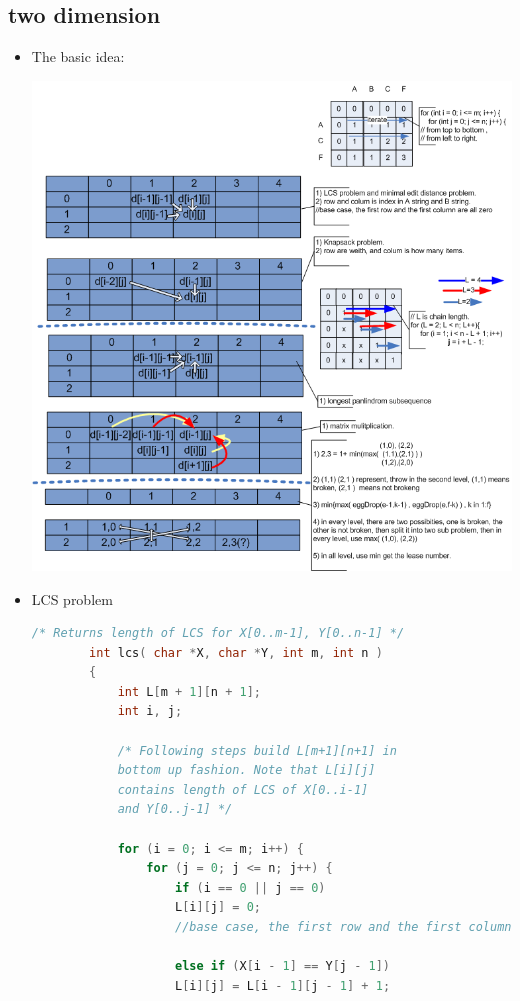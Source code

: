 \documentclass[a4paper,11pt,twoside]{book}
\begin{document}
\subsection{two dimension}

\begin{itemize}
	\item The basic idea: \newline
	
	\includegraphics[scale=0.65]{pics/two_dimension.png} \newline
	
	\item LCS problem 
	\begin{lstlisting}[frame=single, language=c++]
		/* Returns length of LCS for X[0..m-1], Y[0..n-1] */
		int lcs( char *X, char *Y, int m, int n ) 
		{ 
			int L[m + 1][n + 1]; 
			int i, j; 
			
			/* Following steps build L[m+1][n+1] in 
			bottom up fashion. Note that L[i][j] 
			contains length of LCS of X[0..i-1]
			and Y[0..j-1] */
			
			for (i = 0; i <= m; i++) { 
				for (j = 0; j <= n; j++) { 
					if (i == 0 || j == 0)  
					L[i][j] = 0;   
					//base case, the first row and the first column are all zero
					
					else if (X[i - 1] == Y[j - 1]) 
					L[i][j] = L[i - 1][j - 1] + 1; 
					

\end{lstlisting}
\end{itemize}
\end{document}
